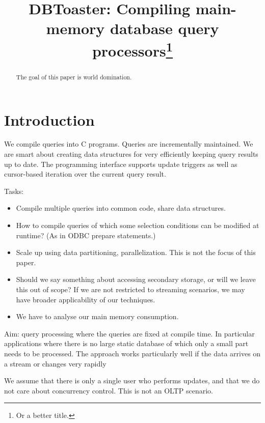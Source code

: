 \documentclass[10pt,twocolumn]{article}
\title{DBToaster: Compiling main-memory database query processors\thanks{Or a better title.}}
\date{}
\begin{document}
\maketitle


\begin{abstract}
The goal of this paper is world domination.
\end{abstract}


\section{Introduction}


We compile queries into C programs. Queries are incrementally maintained.
We are smart about creating data structures for very efficiently keeping query
results up to date. The programming interface supports update triggers as
well as cursor-based iteration over the current query result.

Tasks:
\begin{itemize}
\item
Compile multiple queries into common code, share data structures.

\item
How to compile queries of which some selection conditions can be modified at
runtime? (As in ODBC prepare statements.)

\item
Scale up using data partitioning, parallelization. This is not the focus of
this paper.

\item
Should we say something about accessing secondary storage, or will we leave
this out of scope? If we are not restricted to streaming scenarios, we may
have broader applicability of our techniques.

\item
We have to analyse our main memory consumption.
\end{itemize}


Aim: query processing where the queries are fixed at compile time.
In particular applications where there is no large static database of which
only a small part needs to be processed. The approach works particularly
well if the data arrives on a stream or changes very rapidly

We assume that there is only a single user who performs updates, and that
we do not care about concurrency control.
This is not an OLTP scenario.
\end{document}

